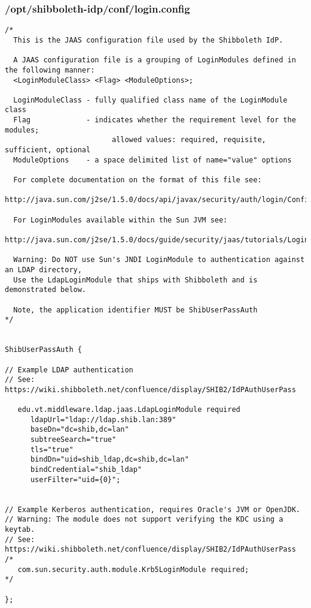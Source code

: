 \subsubsection{/opt/shibboleth-idp/conf/login.config}
\begin{lstlisting}
/*
  This is the JAAS configuration file used by the Shibboleth IdP.

  A JAAS configuration file is a grouping of LoginModules defined in the following manner:
  <LoginModuleClass> <Flag> <ModuleOptions>;

  LoginModuleClass - fully qualified class name of the LoginModule class
  Flag             - indicates whether the requirement level for the modules;
                         allowed values: required, requisite, sufficient, optional
  ModuleOptions    - a space delimited list of name="value" options

  For complete documentation on the format of this file see:
  http://java.sun.com/j2se/1.5.0/docs/api/javax/security/auth/login/Configuration.html

  For LoginModules available within the Sun JVM see:
  http://java.sun.com/j2se/1.5.0/docs/guide/security/jaas/tutorials/LoginConfigFile.html

  Warning: Do NOT use Sun's JNDI LoginModule to authentication against an LDAP directory,
  Use the LdapLoginModule that ships with Shibboleth and is demonstrated below.

  Note, the application identifier MUST be ShibUserPassAuth
*/


ShibUserPassAuth {

// Example LDAP authentication
// See: https://wiki.shibboleth.net/confluence/display/SHIB2/IdPAuthUserPass

   edu.vt.middleware.ldap.jaas.LdapLoginModule required
      ldapUrl="ldap://ldap.shib.lan:389"
      baseDn="dc=shib,dc=lan"
      subtreeSearch="true"
      tls="true"
      bindDn="uid=shib_ldap,dc=shib,dc=lan"
      bindCredential="shib_ldap"
      userFilter="uid={0}";


// Example Kerberos authentication, requires Oracle's JVM or OpenJDK.
// Warning: The module does not support verifying the KDC using a keytab.
// See: https://wiki.shibboleth.net/confluence/display/SHIB2/IdPAuthUserPass
/*
   com.sun.security.auth.module.Krb5LoginModule required;
*/

};
\end{lstlisting}

